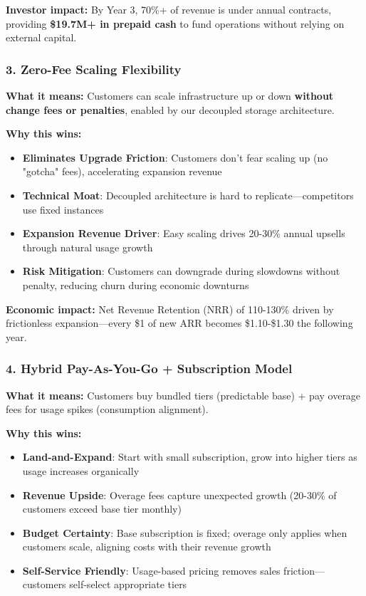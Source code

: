 \textbf{Investor impact:} By Year 3, 70\%+ of revenue is under annual contracts, providing \textbf{\$19.7M+ in prepaid cash} to fund operations without relying on external capital.

\subsubsection{3. Zero-Fee Scaling Flexibility}

\textbf{What it means:} Customers can scale infrastructure up or down \textbf{without change fees or penalties}, enabled by our decoupled storage architecture.

\textbf{Why this wins:}
\begin{itemize}[noitemsep]
    \item \textbf{Eliminates Upgrade Friction}: Customers don't fear scaling up (no "gotcha" fees), accelerating expansion revenue
    \item \textbf{Technical Moat}: Decoupled architecture is hard to replicate—competitors use fixed instances
    \item \textbf{Expansion Revenue Driver}: Easy scaling drives 20-30\% annual upsells through natural usage growth
    \item \textbf{Risk Mitigation}: Customers can downgrade during slowdowns without penalty, reducing churn during economic downturns
\end{itemize}

\textbf{Economic impact:} Net Revenue Retention (NRR) of 110-130\% driven by frictionless expansion—every \$1 of new ARR becomes \$1.10-\$1.30 the following year.

\subsubsection{4. Hybrid Pay-As-You-Go + Subscription Model}

\textbf{What it means:} Customers buy bundled tiers (predictable base) + pay overage fees for usage spikes (consumption alignment).

\textbf{Why this wins:}
\begin{itemize}[noitemsep]
    \item \textbf{Land-and-Expand}: Start with small subscription, grow into higher tiers as usage increases organically
    \item \textbf{Revenue Upside}: Overage fees capture unexpected growth (20-30\% of customers exceed base tier monthly)
    \item \textbf{Budget Certainty}: Base subscription is fixed; overage only applies when customers scale, aligning costs with their revenue growth
    \item \textbf{Self-Service Friendly}: Usage-based pricing removes sales friction—customers self-select appropriate tiers
\end{itemize}

